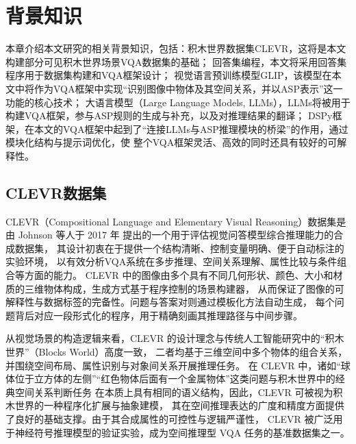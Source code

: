 \newtheorem{definition}{定义}[section]
\newtheorem{example}{例}[section]
\chapter{背景知识}
本章介绍本文研究的相关背景知识，包括：积木世界数据集CLEVR，这将是本文构建部分可见积木世界场景VQA数据集的基础；
回答集编程，本文将采用回答集程序用于数据集构建和VQA框架设计；
视觉语言预训练模型GLIP，该模型在本文中将作为VQA框架中实现“识别图像中物体及其空间关系，并以ASP表示”这一功能的核心技术；
大语言模型（Large Language Models, LLMs），LLMs将被用于构建VQA框架，参与ASP规则的生成与补充，以及对推理结果的翻译；
DSPy框架，在本文的VQA框架中起到了“连接LLMs与ASP推理模块的桥梁”的作用，通过模块化结构与提示词优化，使
整个VQA框架灵活、高效的同时还具有较好的可解释性。
\section{CLEVR数据集}
CLEVR（Compositional Language and Elementary Visual Reasoning）数据集是由 Johnson 等人于 2017 年
提出的一个用于评估视觉问答模型综合推理能力的合成数据集\cite{johnson2017clevr}，
其设计初衷在于提供一个结构清晰、控制变量明确、便于自动标注的实验环境，
以有效分析VQA系统在多步推理、空间关系理解、属性比较与条件组合等方面的能力。
CLEVR 中的图像由多个具有不同几何形状、颜色、大小和材质的三维物体构成，生成方式基于程序控制的场景构建器，
从而保证了图像的可解释性与数据标签的完备性。问题与答案对则通过模板化方法自动生成，
每个问题背后对应一段形式化的程序，用于精确刻画其推理路径与中间步骤。

从视觉场景的构造逻辑来看，CLEVR 的设计理念与传统人工智能研究中的“积木世界”（\-Blocks World）高度一致，
二者均基于三维空间中多个物体的组合关系，并围绕空间布局、属性识别与对象间关系开展推理任务。
在 CLEVR 中，诸如“球体位于立方体的左侧”“红色物体后面有一个金属物体”这类问题与积木世界中的经典空间关系判断任务
在本质上具有相同的语义结构，因此，CLEVR 可被视为积木世界的一种程序化扩展与抽象建模，
其在空间推理表达的广度和精度方面提供了良好的基础支撑。由于其合成属性的可控性与逻辑严谨性，
CLEVR 被广泛用于神经符号推理模型的验证实验，成为空间推理型 VQA 任务的基准数据集之一。

